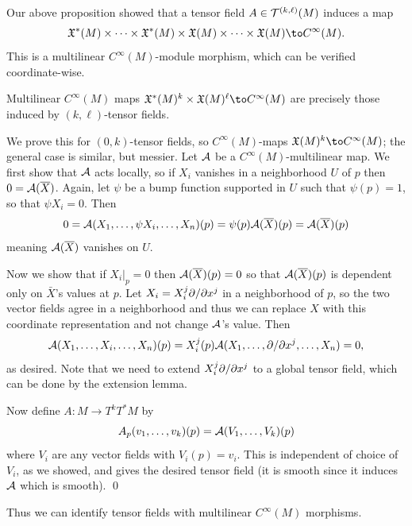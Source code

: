 \eproof

Our above proposition showed that a tensor field $A\in{{\cal T}}^{(k,\ell)}(M)$ induces a map
$$ \X^*(M)\times\cdots\times\X^*(M)\times\X(M)\times\cdots\times\X(M)\to C^\infty(M) . $$
This is a multilinear $C^\infty(M)$-module morphism, which can be verified coordinate-wise.

\blemm

    Multilinear $C^\infty(M)$ maps $\X^*(M)^k\times\X(M)^\ell\to C^\infty(M)$ are precisely those induced by $(k,\ell)$-tensor fields.

\elemm

\bproof

    We prove this for $(0,k)$-tensor fields, so $C^\infty(M)$-maps $\X(M)^k\to C^\infty(M)$; the general case is similar, but messier.
    Let ${\cal A}$ be a $C^\infty(M)$-multilinear map.
    We first show that ${\cal A}$ acts locally, so if $X_i$ vanishes in a neighborhood $U$ of $p$ then $0={\cal A}(\overline X)$.
    Again, let $\psi$ be a bump function supported in $U$ such that $\psi(p)=1$, so that $\psi X_i=0$.
    Then
    $$ 0 = {\cal A}(X_1,\dots,\psi X_i,\dots,X_n)(p) = \psi(p){\cal A}(\overline X)(p) = {\cal A}(\overline X)(p) $$
    meaning ${\cal A}(\overline X)$ vanishes on $U$.

    Now we show that if $X_i|_p=0$ then ${\cal A}(\overline X)(p)=0$ so that ${\cal A}(\overline X)(p)$ is dependent only on $\bar X$'s values at $p$.
    Let $X_i=X^j_i\partial /\partial x^j$ in a neighborhood of $p$, so the two vector fields agree in a neighborhood and thus we can replace $X$ with this coordinate
    representation and not change ${\cal A}$'s value.
    Then
    $$ {\cal A}(X_1,\dots,X_i,\dots,X_n)(p) = X^j_i(p){\cal A}(X_1,\dots,\partial /\partial x^j,\dots,X_n) = 0 , $$
    as desired.
    Note that we need to extend $X^j_i\partial /\partial x^j$ to a global tensor field, which can be done by the extension lemma.

    Now define $A\colon M\to T^kT^*M$ by
    $$ A_p(v_1,\dots,v_k)(p) = {\cal A}(V_1,\dots,V_k)(p) $$
    where $V_i$ are any vector fields with $V_i(p)=v_i$.
    This is independent of choice of $V_i$, as we showed, and gives the desired tensor field (it is smooth since it induces ${{\cal A}}$ which is smooth).
    \qed

\eproof

Thus we can identify tensor fields with multilinear $C^\infty(M)$ morphisms.

